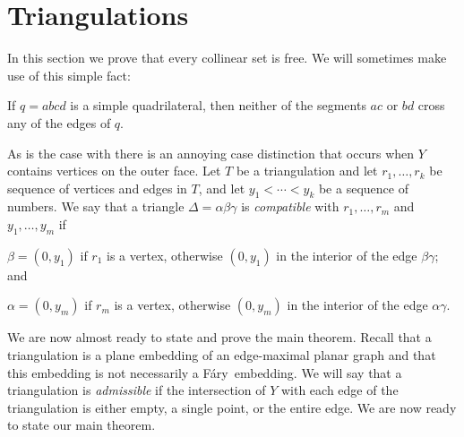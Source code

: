 \documentclass{patmorin}
\newcommand{\Fary}{Fáry}
\begin{document}
\section{Triangulations}

In this section we prove that every collinear set is free.
We will sometimes make use of this simple fact:
\begin{obs}
  If $q=abcd$ is a simple quadrilateral, then neither of the segments $ac$
  or $bd$ cross any of the edges of $q$.
\end{obs}

As is the case with  there is an annoying case distinction
that occurs when $Y$ contains vertices on the outer face.  Let $T$
be a triangulation and let $r_1,\ldots,r_k$ be sequence of vertices
and edges in $T$, and let $y_1<\cdots<y_k$ be a sequence of numbers.
We say that a triangle $\Delta=\alpha\beta\gamma$ is \emph{compatible}
with $r_1,\ldots,r_m$ and $y_1,\ldots,y_m$ if
\begin{compactenum}
  \item $\beta=(0,y_1)$ if $r_1$ is a vertex, otherwise $(0, y_1)$ in the interior
  of the edge $\beta\gamma$; and
  \item $\alpha=(0,y_m)$ if $r_m$ is a vertex, otherwise $(0,y_m)$ in the interior
  of the edge $\alpha\gamma$.
\end{compactenum}

We are now almost ready to state and prove the main theorem.  Recall that
a triangulation is a plane embedding of an edge-maximal planar graph and
that this embedding is not necessarily a \Fary\ embedding.  We will say
that a triangulation is \emph{admissible} if the intersection of $Y$
with each edge of the triangulation is either empty, a single point,
or the entire edge.  We are now ready to state our main theorem.
\end{document}
